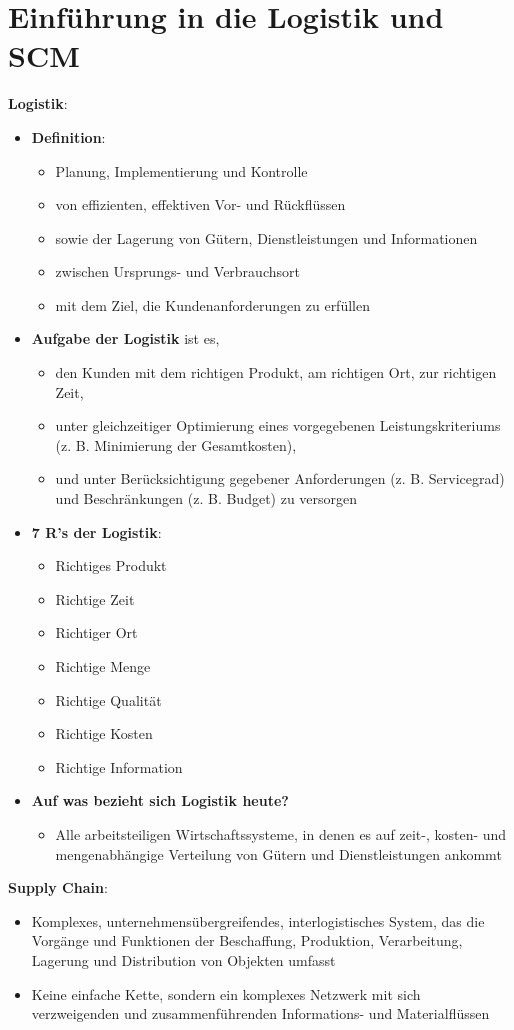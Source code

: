 \section{Einführung in die Logistik und SCM}

\textbf{Logistik}:
\begin{itemize}
	\item \textbf{Definition}: 
	\begin{itemize}
		\item Planung, Implementierung und Kontrolle 
		\item von effizienten, effektiven Vor- und Rückflüssen 
		\item sowie der Lagerung von Gütern, Dienstleistungen und Informationen 
		\item zwischen Ursprungs- und Verbrauchsort 
		\item mit dem Ziel, die Kundenanforderungen zu erfüllen
	\end{itemize}
	\item \textbf{Aufgabe der Logistik} ist es,
	\begin{itemize}
		\item den Kunden mit dem richtigen Produkt, am richtigen Ort, zur richtigen Zeit,
		\item unter gleichzeitiger Optimierung eines vorgegebenen Leistungskriteriums (z. B.
		Minimierung der Gesamtkosten),
		\item und unter Berücksichtigung gegebener Anforderungen (z. B. Servicegrad) und
		Beschränkungen (z. B. Budget) zu versorgen
	\end{itemize}
	\item \textbf{7 R's der Logistik}:
	\begin{itemize}
		\item Richtiges Produkt
		\item Richtige Zeit
		\item Richtiger Ort
		\item Richtige Menge
		\item Richtige Qualität
		\item Richtige Kosten
		\item Richtige Information
	\end{itemize}
	\item \textbf{Auf was bezieht sich Logistik heute?}
	\begin{itemize}
		\item Alle arbeitsteiligen Wirtschaftssysteme, in denen es auf zeit-, kosten- und
		mengenabhängige Verteilung von Gütern und Dienstleistungen ankommt
	\end{itemize}
\end{itemize}
\bigskip
\textbf{Supply Chain}: 
\begin{itemize}
	\item Komplexes, unternehmensübergreifendes, interlogistisches System, das die Vorgänge und Funktionen der Beschaffung, Produktion, Verarbeitung, Lagerung und Distribution von Objekten umfasst
	\item Keine einfache Kette, sondern ein komplexes Netzwerk mit sich verzweigenden und zusammenführenden Informations- und Materialflüssen
\end{itemize}

